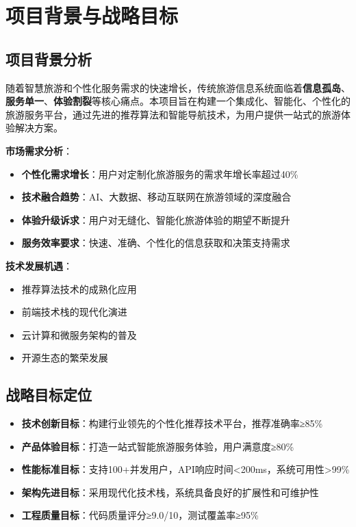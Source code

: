 \documentclass[12pt,a4paper]{article}
\begin{document}
\newpage

\renewcommand{\contentsname}{\color{primary}\Large\textbf{目录}}
\tableofcontents
\newpage

\section{项目背景与战略目标}

\subsection{项目背景分析}

\begin{infobox}[title={行业背景与市场机遇}]
随着智慧旅游和个性化服务需求的快速增长，传统旅游信息系统面临着\textcolor{primary}{\textbf{信息孤岛}}、\textcolor{secondary}{\textbf{服务单一}}、\textcolor{warning}{\textbf{体验割裂}}等核心痛点。本项目旨在构建一个集成化、智能化、个性化的旅游服务平台，通过先进的推荐算法和智能导航技术，为用户提供一站式的旅游体验解决方案。
\end{infobox}

\textbf{市场需求分析}：
\begin{itemize}
    \item \textbf{个性化需求增长}：用户对定制化旅游服务的需求年增长率超过40\%
    \item \textbf{技术融合趋势}：AI、大数据、移动互联网在旅游领域的深度融合
    \item \textbf{体验升级诉求}：用户对无缝化、智能化旅游体验的期望不断提升
    \item \textbf{服务效率要求}：快速、准确、个性化的信息获取和决策支持需求
\end{itemize}

\textbf{技术发展机遇}：
\begin{itemize}
    \item 推荐算法技术的成熟化应用
    \item 前端技术栈的现代化演进
    \item 云计算和微服务架构的普及
    \item 开源生态的繁荣发展
\end{itemize}

\subsection{战略目标定位}

\begin{successbox}[title={项目战略目标}]
\begin{itemize}[nosep]
    \item \textbf{技术创新目标}：构建行业领先的个性化推荐技术平台，推荐准确率≥85\%
    \item \textbf{产品体验目标}：打造一站式智能旅游服务体验，用户满意度≥80\%
    \item \textbf{性能标准目标}：支持100+并发用户，API响应时间<200ms，系统可用性>99\%
    \item \textbf{架构先进目标}：采用现代化技术栈，系统具备良好的扩展性和可维护性
    \item \textbf{工程质量目标}：代码质量评分≥9.0/10，测试覆盖率≥95\%
\end{itemize}
\end{successbox}
\end{document}
